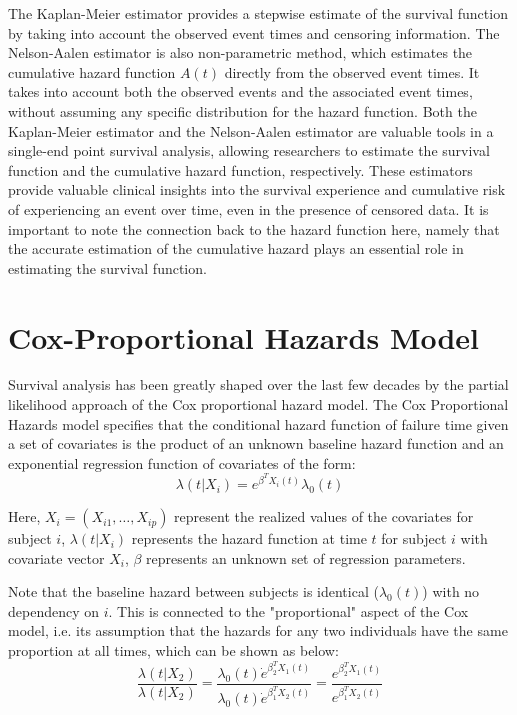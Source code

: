 The Kaplan-Meier estimator provides a stepwise estimate of the survival function by taking into account the observed event times and censoring information. The Nelson-Aalen estimator is also non-parametric method, which estimates the cumulative hazard function $A(t)$ directly from the observed event times. It takes into account both the observed events and the associated event times, without assuming any specific distribution for the hazard function. Both the Kaplan-Meier estimator and the Nelson-Aalen estimator are valuable tools in a single-end point survival analysis, allowing researchers to estimate the survival function and the cumulative hazard function, respectively. These estimators provide valuable clinical insights into the survival experience and cumulative risk of experiencing an event over time, even in the presence of censored data. It is important to note the connection back to the hazard function here, namely that the accurate estimation of the cumulative hazard plays an essential role in estimating the survival function.


\section{Cox-Proportional Hazards Model}

Survival analysis has been greatly shaped over the last few decades by the partial likelihood approach of the Cox proportional hazard model. The Cox Proportional Hazards model specifies that the conditional hazard function of failure time given a set of covariates is the product of an unknown baseline hazard function and an exponential regression function of covariates of the form:
\begin{equation}
\lambda(t|X_i) = e^{\beta^T X_i(t)} \lambda_0 (t)
\end{equation}

Here, $X_i = (X_{i1}, … , X_{ip})$ represent the realized values of the covariates for subject $i$, $\lambda(t|X_i)$ represents the  hazard function at time $t$ for subject $i$ with covariate vector $X_i$, $\beta$ represents an unknown set of regression parameters. 
\smallskip\par
Note that the baseline hazard between subjects is identical ($\lambda_0 (t)$) with no dependency on $i$. This is connected to the "proportional" aspect of the Cox model, i.e. its assumption that the hazards for any two individuals have the same proportion at all times, which can be shown as below:
\begin{equation}
\frac{\lambda(t|X_2)}{\lambda(t|X_2)} = \frac{\lambda_0 (t) \dot e^{\beta_2^T X_1(t)}}{\lambda_0 (t) \dot e^{\beta_1^T X_2(t)}} = \frac{e^{\beta_2^T X_1(t)}}{e^{\beta_1^T X_2(t)}}
\end{equation}


